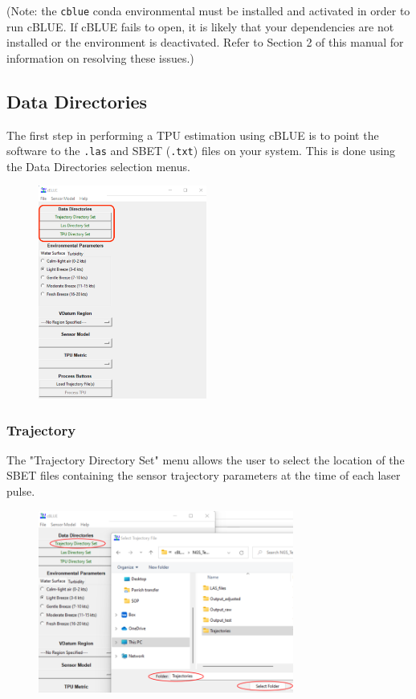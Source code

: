 \documentclass[11pt, a4paper]{article}
\begin{document}
(Note: the \texttt{cblue} conda environmental must be installed and activated in order to run cBLUE. If cBLUE fails to open, it is likely that your dependencies are not installed or the environment is deactivated. Refer to Section 2 of this manual for information on resolving these issues.)



\subsection{Data Directories}
The first step in performing a TPU estimation using cBLUE is to point the software to the \texttt{.las} and SBET (\texttt{.txt}) files on your system. This is done using the Data Directories selection menus. 

\begin{figure}[H]
    \centering
    \includegraphics[height=7cm]{figs/cblue_menu_data_dir.png}
\end{figure}

\subsubsection{Trajectory}
The "Trajectory Directory Set" menu allows the user to select the location of the SBET files containing the sensor trajectory parameters at the time of each laser pulse.

\begin{figure}[H]
    \centering
    \includegraphics[height=6cm]{figs/select_traj.png}
\end{figure}
\end{document}
